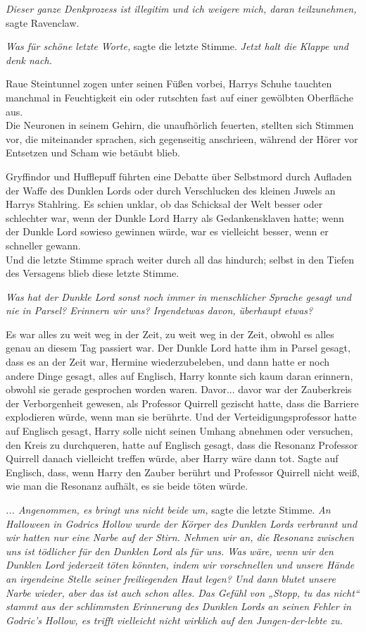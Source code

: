 {\emph{Dieser ganze Denkprozess ist illegitim und ich weigere mich, daran teilzunehmen,} sagte Ravenclaw.

\emph{Was für schöne letzte Worte,} sagte die letzte Stimme. \emph{Jetzt halt die Klappe und denk nach.}

Raue Steintunnel zogen unter seinen Füßen vorbei, Harrys Schuhe tauchten manchmal in Feuchtigkeit ein oder rutschten fast auf einer gewölbten Oberfläche aus.\\ Die Neuronen in seinem Gehirn, die unaufhörlich feuerten, stellten sich Stimmen vor, die miteinander sprachen, sich gegenseitig anschrieen, während der Hörer vor Entsetzen und Scham wie betäubt blieb.

Gryffindor und Hufflepuff führten eine Debatte über Selbstmord durch Aufladen der Waffe des Dunklen Lords oder durch Verschlucken des kleinen Juwels an Harrys Stahlring. Es schien unklar, ob das Schicksal der Welt besser oder schlechter war, wenn der Dunkle Lord Harry als Gedankensklaven hatte; wenn der Dunkle Lord sowieso gewinnen würde, war es vielleicht besser, wenn er schneller gewann.\\ Und die letzte Stimme sprach weiter durch all das hindurch; selbst in den Tiefen des Versagens blieb diese letzte Stimme.

\emph{Was hat der Dunkle Lord sonst noch immer in menschlicher Sprache gesagt und nie in Parsel? Erinnern wir uns? Irgendetwas davon, überhaupt etwas?}

Es war alles zu weit weg in der Zeit, zu weit weg in der Zeit, obwohl es alles genau an diesem Tag passiert war. Der Dunkle Lord hatte ihm in Parsel gesagt, dass es an der Zeit war, Hermine wiederzubeleben, und dann hatte er noch andere Dinge gesagt, alles auf Englisch, Harry konnte sich kaum daran erinnern, obwohl sie gerade gesprochen worden waren. Davor... davor war der Zauberkreis der Verborgenheit gewesen, als Professor Quirrell gezischt hatte, dass die Barriere explodieren würde, wenn man sie berührte. Und der Verteidigungsprofessor hatte auf Englisch gesagt, Harry solle nicht seinen Umhang abnehmen oder versuchen, den Kreis zu durchqueren, hatte auf Englisch gesagt, dass die Resonanz Professor Quirrell danach vielleicht treffen würde, aber Harry wäre dann tot. Sagte auf Englisch, dass, wenn Harry den Zauber berührt und Professor Quirrell nicht weiß, wie man die Resonanz aufhält, es sie beide töten würde.

\emph{... Angenommen, es bringt uns nicht beide um,} sagte die letzte Stimme. \emph{An Halloween in Godrics Hollow wurde der Körper des Dunklen Lords verbrannt und wir hatten nur eine Narbe auf der Stirn. Nehmen wir an, die Resonanz zwischen uns ist tödlicher für den Dunklen Lord als für uns. Was wäre, wenn wir den Dunklen Lord jederzeit töten könnten, indem wir vorschnellen und unsere Hände an irgendeine Stelle seiner freiliegenden Haut legen? Und dann blutet unsere Narbe wieder, aber das ist auch schon alles. Das Gefühl von „Stopp, tu das nicht“ stammt aus der schlimmsten Erinnerung des Dunklen Lords an seinen Fehler in Godric's Hollow, es trifft vielleicht nicht wirklich auf den Jungen-der-lebte zu.}

}
